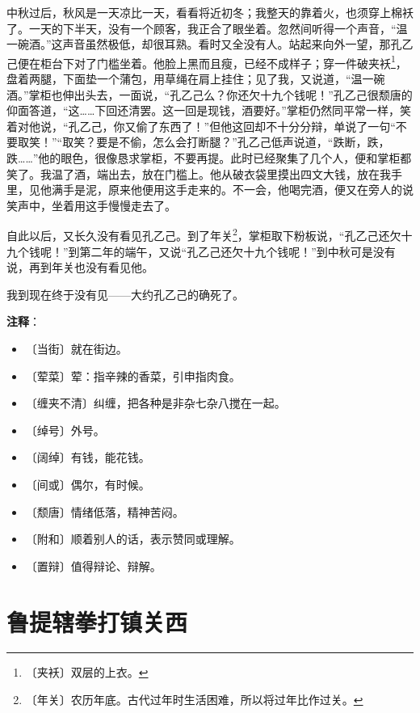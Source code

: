 \documentclass[12pt,UTF-8,openany]{ctexbook}
\begin{document}
\begin{normalsize}
    中秋过后，秋风是一天凉比一天，看看将近初冬；我整天的靠着火，也须穿上棉袄了。一天的下半天，没有一个顾客，我正合了眼坐着。忽然间听得一个声音，“温一碗酒。”这声音虽然极低，却很耳熟。看时又全没有人。站起来向外一望，那孔乙己便在柜台下对了门槛坐着。他脸上黑而且瘦，已经不成样子；穿一件破夹袄\footnote{〔夹袄〕双层的上衣。}，盘着两腿，下面垫一个蒲包，用草绳在肩上挂住；见了我，又说道，“温一碗酒。”掌柜也伸出头去，一面说，“孔乙己么？你还欠十九个钱呢！”孔乙己很颓唐的仰面答道，“这……下回还清罢。这一回是现钱，酒要好。”掌柜仍然同平常一样，笑着对他说，“孔乙己，你又偷了东西了！”但他这回却不十分分辩，单说了一句“不要取笑！”“取笑？要是不偷，怎么会打断腿？”孔乙己低声说道，“跌断，跌，跌……”他的眼色，很像恳求掌柜，不要再提。此时已经聚集了几个人，便和掌柜都笑了。我温了酒，端出去，放在门槛上。他从破衣袋里摸出四文大钱，放在我手里，见他满手是泥，原来他便用这手走来的。不一会，他喝完酒，便又在旁人的说笑声中，坐着用这手慢慢走去了。
    
    自此以后，又长久没有看见孔乙己。到了年关\footnote{〔年关〕农历年底。古代过年时生活困难，所以将过年比作过关。}，掌柜取下粉板说，“孔乙己还欠十九个钱呢！”到第二年的端午，又说“孔乙己还欠十九个钱呢！”到中秋可是没有说，再到年关也没有看见他。
    
    我到现在终于没有见——大约孔乙己的确死了。
    
\end{normalsize}


\newpage

\textbf{注释}：

\vspace{-1em}

\begin{itemize}
    \setlength\itemsep{-0.2em}
    \item 〔当街〕就在街边。
    \item 〔荤菜〕荤：指辛辣的香菜，引申指肉食。
    \item 〔缠夹不清〕纠缠，把各种是非杂七杂八搅在一起。
    \item 〔绰号〕外号。
    \item 〔阔绰〕有钱，能花钱。
    \item 〔间或〕偶尔，有时候。
    \item 〔颓唐〕情绪低落，精神苦闷。
    \item 〔附和〕顺着别人的话，表示赞同或理解。
    \item 〔置辩〕值得辩论、辩解。
\end{itemize}

\chapter{鲁提辖拳打镇关西}
\end{document}
